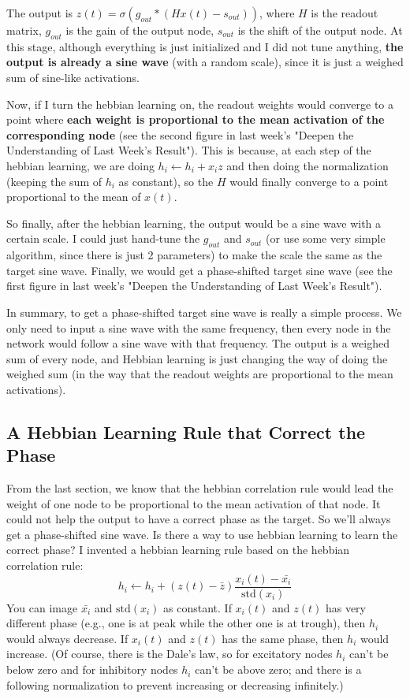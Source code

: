 \documentclass[12pt, a4paper]{article}
\begin{document}
The output is $z(t)=\sigma(g_{out}*(Hx(t)-s_{out}))$, where $H$ is the readout matrix, $g_{out}$ is the gain of the output node, $s_{out}$ is the shift of the output node. At this stage, although everything is just initialized and I did not tune anything, \textbf{the output is already a sine wave} (with a random scale), since it is just a weighed sum of sine-like activations.

Now, if I turn the hebbian learning on, the readout weights would converge to a point where \textbf{each weight is proportional to the mean activation of the corresponding node} (see the second figure in last week's "Deepen the Understanding of Last Week's Result"). This is because, at each step of the hebbian learning, we are doing $h_i \leftarrow h_i + x_i z$ and then doing the normalization (keeping the sum of $h_i$ as constant), so the $H$ would finally converge to a point proportional to the mean of $x(t)$.

So finally, after the hebbian learning, the output would be a sine wave with a certain scale. I could just hand-tune the $g_{out}$ and $s_{out}$ (or use some very simple algorithm, since there is just 2 parameters) to make the scale the same as the target sine wave. Finally, we would get a phase-shifted target sine wave (see the first figure in last week's "Deepen the Understanding of Last Week's Result").

In summary, to get a phase-shifted target sine wave is really a simple process. We only need to input a sine wave with the same frequency, then every node in the network would follow a sine wave with that frequency. The output is a weighed sum of every node, and Hebbian learning is just changing the way of doing the weighed sum (in the way that the readout weights are proportional to the mean activations).

\newpage

\subsection*{A Hebbian Learning Rule that Correct the Phase}

From the last section, we know that the hebbian correlation rule would lead the weight of one node to be proportional to the mean activation of that node. It could not help the output to have a correct phase as the target. So we'll always get a phase-shifted sine wave. Is there a way to use hebbian learning to learn the correct phase? I invented a hebbian learning rule based on the hebbian correlation rule: $$h_i \leftarrow h_i + (z(t) - \bar{z}) \frac{x_i(t) - \bar{x_i}}{\text{std}(x_i)}$$
You can image $\bar{x_i}$ and $\text{std}(x_i)$ as constant. If $x_i(t)$ and $z(t)$ has very different phase (e.g., one is at peak while the other one is at trough), then $h_i$ would always decrease. If $x_i(t)$ and $z(t)$ has the same phase, then $h_i$ would increase. (Of course, there is the Dale's law, so for excitatory nodes $h_i$ can't be below zero and for inhibitory nodes $h_i$ can't be above zero; and there is a following normalization to prevent increasing or decreasing infinitely.)
\end{document}
